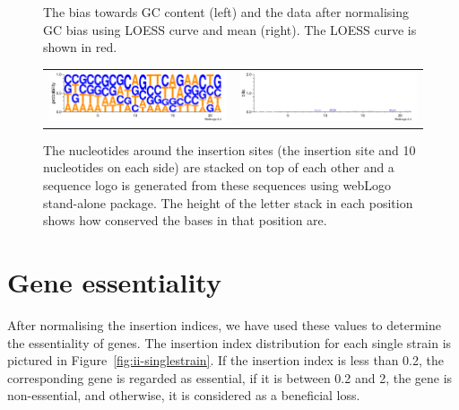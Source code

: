 \documentclass[a4paper,10pt, twocolumn]{article}
\begin{document}
\begin{figure}
\begin{tabular}{c c}
\end{tabular}
\caption{The bias towards GC content (left) and the data after normalising GC bias using LOESS curve and mean (right). The LOESS curve is shown in red.}
\label{fig:GC_bias}
\end{figure}

\begin{figure}[H]
\centering
\begin{tabular}{c c}
\includegraphics[scale=.98, angle = -90]{logos/logo-prob.pdf} &
\includegraphics[scale=.98, angle = -90]{logos/logo-bits.pdf}
\end{tabular}
\caption{The nucleotides around the insertion sites (the insertion site and 10 nucleotides on each side) are stacked on top of each other and a sequence logo is generated from these sequences using webLogo stand-alone package. The height of the letter stack in each position shows how conserved the bases in that position are.}
\label{fig:logo}
\end{figure}

\section{Gene essentiality}
After normalising the insertion indices, we have used these values to determine the essentiality of genes. The insertion index distribution for each single strain is pictured in Figure~\ref{fig:ii-singlestrain}. If the insertion index is less than 0.2, the corresponding gene is regarded as essential, if it is between 0.2 and 2, the gene is non-essential, and otherwise, it is considered as a beneficial loss.
\end{document}
